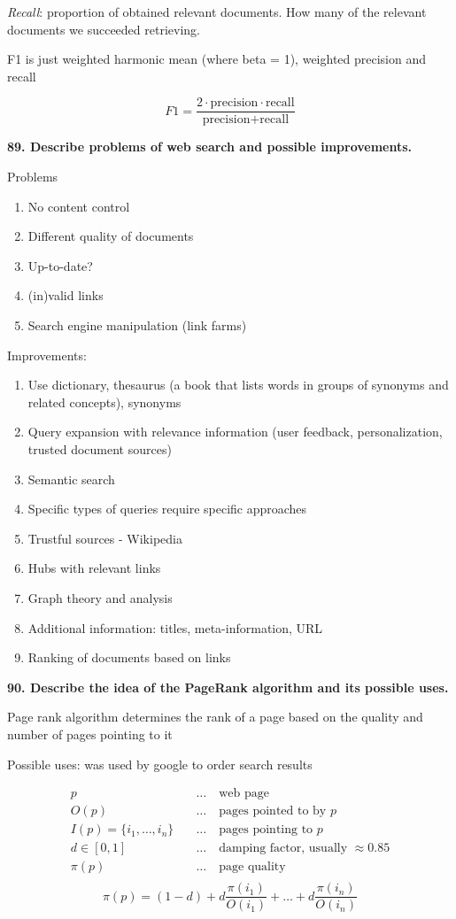 \textit{Recall}: proportion of obtained relevant documents. How many
of the relevant documents we succeeded retrieving.

F1 is just weighted harmonic mean (where beta = 1), weighted precision
and recall

\[ F1 = \frac{2 \cdot \text{precision} \cdot \text{recall} }{\text{precision} + \text{recall}} \]

\textbf{89. Describe problems of web search and possible improvements.}

Problems

\begin{enumerate}
\def\labelenumi{\arabic{enumi}.}
\item No content control
\item Different quality of documents
\item Up-to-date?
\item (in)valid links
\item Search engine manipulation (link farms)
\end{enumerate}

Improvements:

\begin{enumerate}
\def\labelenumi{\arabic{enumi}.}
\item Use dictionary, thesaurus (a book that lists words in groups of
  synonyms and related concepts), synonyms
\item Query expansion with relevance information (user feedback,
  personalization, trusted document sources)
\item Semantic search
\item Specific types of queries require specific approaches
\item Trustful sources - Wikipedia
\item Hubs with relevant links
\item Graph theory and analysis
\item Additional information: titles, meta-information, URL
\item Ranking of documents based on links
\end{enumerate}

\textbf{90. Describe the idea of the PageRank algorithm and its possible uses.}

Page rank algorithm determines the rank of a page based on the quality
and number of pages pointing to it

Possible uses: was used by google to order search results

\begin{align*}
  p \quad &\dots \quad \text{web page} \\
  O(p) \quad &\dots \quad \text{pages pointed to by $p$} \\
  I(p) = \{i_1, \dots, i_n\} \quad &\dots \quad \text{pages pointing to $p$} \\
  d \in [0, 1] \quad &\dots \quad \text{damping factor, usually $\approx 0.85$} \\
  \pi(p) \quad &\dots \quad \text{page quality} \\
\end{align*}
\[ \pi(p) = (1-d) + d\frac{\pi(i_1)}{O(i_1)} + \dots + d\frac{\pi(i_n)}{O(i_n)}\]


